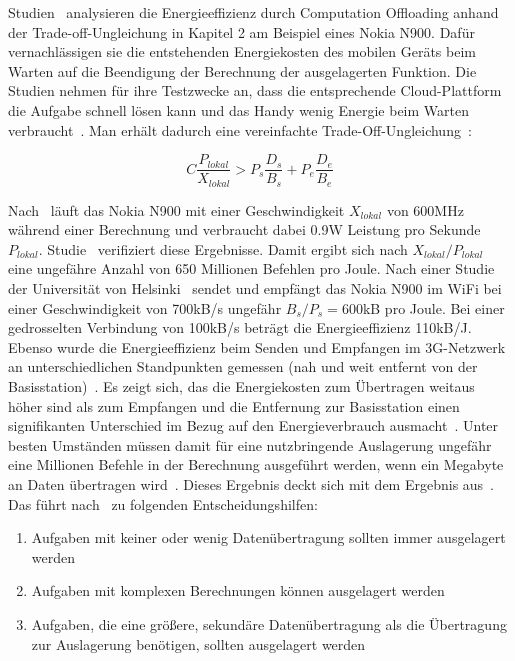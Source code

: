 \documentclass{sigchi}
\begin{document}
Studien~\cite{o8, o12} analysieren die Energieeffizienz durch Computation Offloading anhand der Trade-off-Ungleichung in Kapitel 2 am Beispiel eines Nokia N900.
Dafür vernachlässigen sie die entstehenden Energiekosten des mobilen Geräts beim Warten auf die Beendigung der Berechnung der ausgelagerten Funktion.
Die Studien nehmen für ihre Testzwecke an, dass die entsprechende Cloud-Plattform die Aufgabe schnell lösen kann und das Handy wenig Energie beim Warten verbraucht~\cite{o8}.
Man erhält dadurch eine vereinfachte Trade-Off-Ungleichung~\cite{o8}:

\begin{equation*}
	C\frac{P_{\textit{lokal}}}{X_{\textit{lokal}}} > P_s\frac{D_s}{B_s} + P_e\frac{D_e}{B_e}
\end{equation*}

Nach~\cite{o8} läuft das Nokia N900 mit einer Geschwindigkeit $X_{\textit{lokal}}$ von 600MHz während einer Berechnung und verbraucht dabei 0.9W Leistung pro Sekunde $P_{\textit{lokal}}$.
Studie~\cite{o12} verifiziert diese Ergebnisse.
Damit ergibt sich nach $X_{\textit{lokal}}/P_{\textit{lokal}}$ eine ungefähre Anzahl von 650 Millionen Befehlen pro Joule.
Nach einer Studie der Universität von Helsinki~\cite{o8} sendet und empfängt das Nokia N900 im WiFi bei einer Geschwindigkeit von 700kB/s ungefähr $B_s/P_s = 600$kB pro Joule.
Bei einer gedrosselten Verbindung von 100kB/s beträgt die Energieeffizienz 110kB/J.
Ebenso wurde die Energieeffizienz beim Senden und Empfangen im 3G-Netzwerk an unterschiedlichen Standpunkten gemessen (nah und weit entfernt von der Basisstation)~\cite{o12}.
Es zeigt sich, das die Energiekosten zum Übertragen weitaus höher sind als zum Empfangen und die Entfernung zur Basisstation einen signifikanten Unterschied im Bezug auf den Energieverbrauch ausmacht~\cite{o12}.
Unter besten Umständen müssen damit für eine nutzbringende Auslagerung ungefähr eine Millionen Befehle in der Berechnung ausgeführt werden, wenn ein Megabyte an Daten übertragen wird~\cite{o12}.
Dieses Ergebnis deckt sich mit dem Ergebnis aus~\cite{o8}.
Das führt nach~\cite{o8} zu folgenden Entscheidungshilfen:
\begin{enumerate}
	\item Aufgaben mit keiner oder wenig Datenübertragung sollten immer ausgelagert werden
	\item Aufgaben mit komplexen Berechnungen können ausgelagert werden
	\item Aufgaben, die eine größere, sekundäre Datenübertragung als die Übertragung zur Auslagerung benötigen, sollten ausgelagert werden
\end{enumerate}
\end{document}
